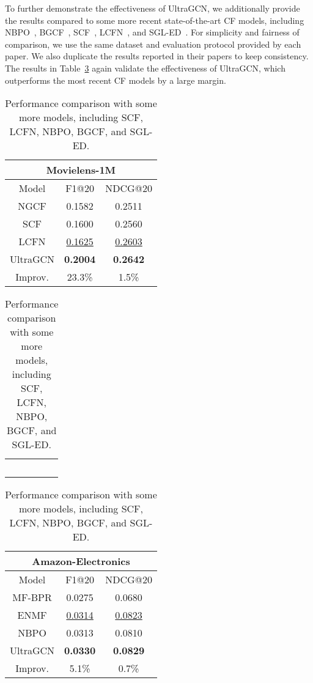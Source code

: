 \documentclass[sigconf,authorversion]{acmart}
\begin{document}
To further demonstrate the effectiveness of UltraGCN, we additionally provide the results compared to some more recent state-of-the-art CF models, including NBPO~\cite{NBPO}, BGCF~\cite{BGCF}, SCF~\cite{SpectralCF}, LCFN~\cite{LCFN}, and SGL-ED~\cite{SGL-ED}. For simplicity and fairness of comparison, we use the same dataset and evaluation protocol provided by each paper. We also duplicate the results reported in their papers to keep consistency. The results in Table~\ref{addtional_res1} again validate the effectiveness of UltraGCN, which outperforms the most recent CF models by a large margin.

\vspace{-1.5ex}

\begin{table}[H]
\centering
\caption{Performance comparison with some more models, including SCF, LCFN, NBPO,  BGCF, and SGL-ED.} \label{addtional_res1}


{\setlength{\tabcolsep}{7pt}
\begin{tabular}{ccc}
\hline
\multicolumn{3}{c}{Movielens-1M}      \\ \hline
Model     & F1@20           & NDCG@20         \\ \hline
NGCF     & 0.1582          & 0.2511          \\
SCF      & 0.1600          & 0.2560          \\
LCFN      & \underline{0.1625}          & \underline{0.2603}          \\ \hline
UltraGCN  & \textbf{0.2004} & \textbf{0.2642} \\
Improv. & 23.3\%           & 1.5\%           \\ \hline
\end{tabular}
}

\begin{tabular}{c}
~\vspace{0ex}
\end{tabular}


{\setlength{\tabcolsep}{7pt}
\begin{tabular}{ccc}
\hline
\multicolumn{3}{c}{Amazon-Electronics}      \\ \hline
Model    & F1@20           & NDCG@20         \\ \hline
MF-BPR   & 0.0275          & 0.0680          \\
ENMF     & \underline{0.0314}          & \underline{0.0823}          \\
NBPO     & 0.0313          & 0.0810          \\ \hline
UltraGCN & \textbf{0.0330} & \textbf{0.0829} \\
Improv.  & 5.1\%           & 0.7\%           \\ \hline
\end{tabular}
}


\end{table}
\end{document}
